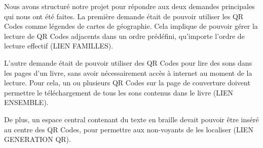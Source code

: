 \par
Nous avons structuré notre projet pour répondre aux deux demandes principales qui nous ont été faites. La première demande était de pouvoir utiliser les QR Codes comme légendes de cartes de géographie. Cela implique de pouvoir gérer la lecture de QR Codes adjacents dans un ordre prédéfini, qu'importe l'ordre de lecture effectif (LIEN FAMILLES).\\

\par
L'autre demande était de pouvoir utiliser des QR Codes pour lire des sons dans les pages d'un livre, sans avoir nécessairement accès à internet au moment de la lecture. Pour cela, un ou plusieurs QR Codes sur la page de couverture doivent permettre le téléchargement de tous les sons contenus dans le livre (LIEN ENSEMBLE).\\

\par
De plus, un espace central contenant du texte en braille devait pouvoir être inséré au centre des QR Codes, pour permettre aux non-voyants de les localiser (LIEN GENERATION QR).